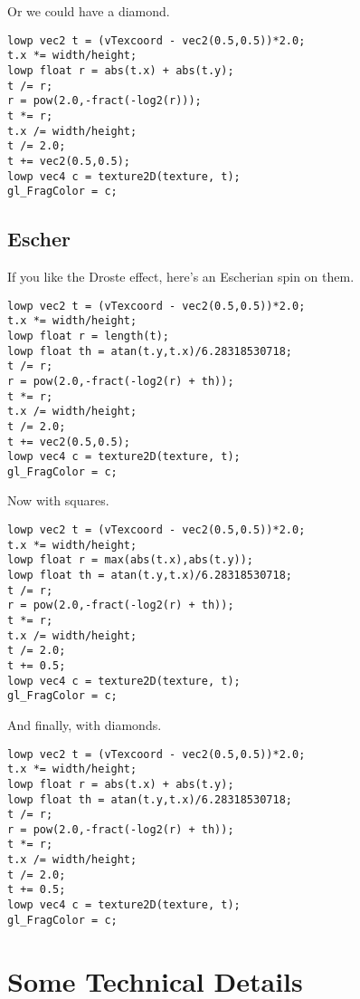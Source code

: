 \documentclass[
  html5,%
  mathml,%
  use filename%
]{internet}
\makeatletter
\let\prev@sec=\section
\renewcommand\section{\clearpage\prev@sec}
\makeatother
\begin{document}
Or we could have a diamond.

\begin{tcolorbox}
\begin{verbatim}
lowp vec2 t = (vTexcoord - vec2(0.5,0.5))*2.0;
t.x *= width/height;
lowp float r = abs(t.x) + abs(t.y);
t /= r;
r = pow(2.0,-fract(-log2(r)));
t *= r;
t.x /= width/height;
t /= 2.0;
t += vec2(0.5,0.5);
lowp vec4 c = texture2D(texture, t);
gl_FragColor = c;
\end{verbatim}
\end{tcolorbox}

\subsection{Escher}

If you like the Droste effect, here's an Escherian spin on them.

\begin{tcolorbox}
\begin{verbatim}
lowp vec2 t = (vTexcoord - vec2(0.5,0.5))*2.0;
t.x *= width/height;
lowp float r = length(t);
lowp float th = atan(t.y,t.x)/6.28318530718;
t /= r;
r = pow(2.0,-fract(-log2(r) + th));
t *= r;
t.x /= width/height;
t /= 2.0;
t += vec2(0.5,0.5);
lowp vec4 c = texture2D(texture, t);
gl_FragColor = c;
\end{verbatim}
\end{tcolorbox}

Now with squares.

\begin{tcolorbox}
\begin{verbatim}
lowp vec2 t = (vTexcoord - vec2(0.5,0.5))*2.0;
t.x *= width/height;
lowp float r = max(abs(t.x),abs(t.y));
lowp float th = atan(t.y,t.x)/6.28318530718;
t /= r;
r = pow(2.0,-fract(-log2(r) + th));
t *= r;
t.x /= width/height;
t /= 2.0;
t += 0.5;
lowp vec4 c = texture2D(texture, t);
gl_FragColor = c;
\end{verbatim}
\end{tcolorbox}


And finally, with diamonds.

\begin{tcolorbox}
\begin{verbatim}
lowp vec2 t = (vTexcoord - vec2(0.5,0.5))*2.0;
t.x *= width/height;
lowp float r = abs(t.x) + abs(t.y);
lowp float th = atan(t.y,t.x)/6.28318530718;
t /= r;
r = pow(2.0,-fract(-log2(r) + th));
t *= r;
t.x /= width/height;
t /= 2.0;
t += 0.5;
lowp vec4 c = texture2D(texture, t);
gl_FragColor = c;
\end{verbatim}
\end{tcolorbox}

\section{Some Technical Details}
\end{document}
